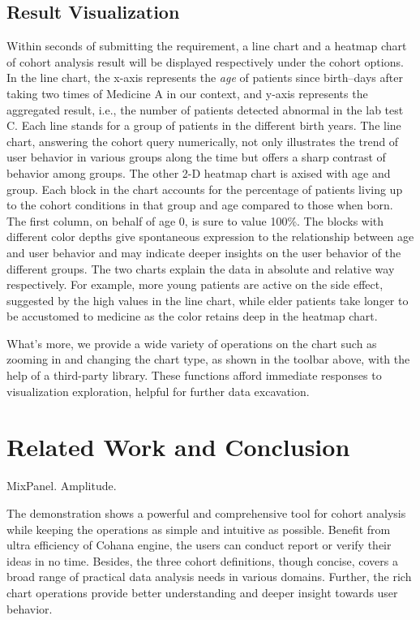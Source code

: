 \documentclass[10pt,conference,letterpaper]{IEEEtran}
\begin{document}
\subsection{Result Visualization}

Within seconds of submitting the requirement, a line chart and a heatmap chart of cohort analysis result will be displayed respectively under the cohort options. In the line chart, the x-axis represents the \emph{age} of patients since birth--days after taking two times of Medicine A in our context, and y-axis represents the aggregated result, i.e., the number of patients detected abnormal in the lab test C. Each line stands for a group of patients in the different birth years. The line chart, answering the cohort query numerically, not only illustrates the trend of user behavior in various groups along the time but offers a sharp contrast of behavior among groups. The other 2-D heatmap chart is axised with age and group. Each block in the chart accounts for the percentage of patients living up to the cohort conditions in that group and age compared to those when born. The first column, on behalf of age 0, is sure to value 100\%. The blocks with different color depths give spontaneous expression to the relationship between age and user behavior and may indicate deeper insights on the user behavior of the different groups. The two charts explain the data in absolute and relative way respectively. For example, more young patients are active on the side effect, suggested by the high values in the line chart, while elder patients take longer to be accustomed to medicine as the color retains deep in the heatmap chart.

What's more, we provide a wide variety of operations on the chart such as zooming in and changing the chart type, as shown in the toolbar above, with the help of a third-party library. These functions afford immediate responses to visualization exploration, helpful for further data excavation.

\section{Related Work and Conclusion}

MixPanel. Amplitude. 

The demonstration shows a powerful and comprehensive tool for cohort analysis while keeping the operations as simple and intuitive as possible. Benefit from ultra efficiency of Cohana engine, the users can conduct report or verify their ideas in no time. Besides, the three cohort definitions, though concise, covers a broad range of practical data analysis needs in various domains. Further, the rich chart operations provide better understanding and deeper insight towards user behavior.







\end{document}
